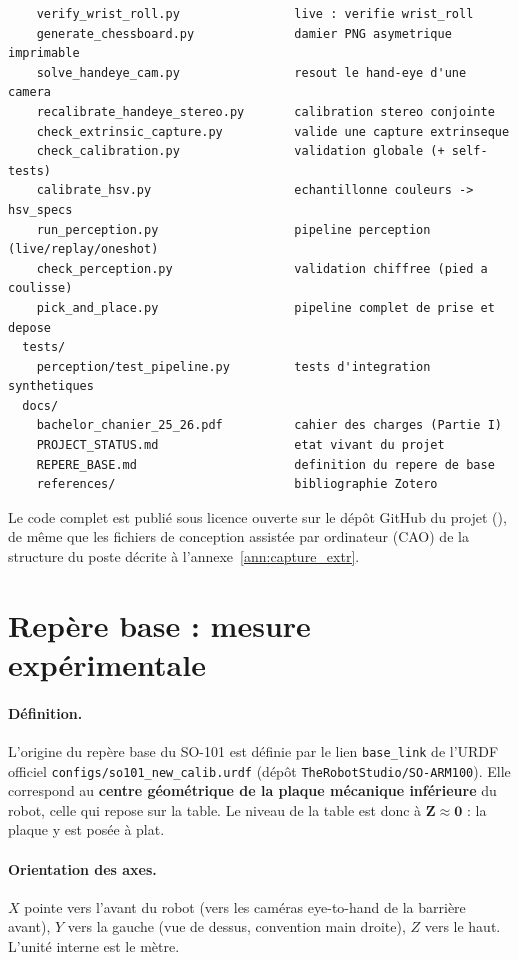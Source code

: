 \begin{verbatim}
    verify_wrist_roll.py                live : verifie wrist_roll
    generate_chessboard.py              damier PNG asymetrique imprimable
    solve_handeye_cam.py                resout le hand-eye d'une camera
    recalibrate_handeye_stereo.py       calibration stereo conjointe
    check_extrinsic_capture.py          valide une capture extrinseque
    check_calibration.py                validation globale (+ self-tests)
    calibrate_hsv.py                    echantillonne couleurs -> hsv_specs
    run_perception.py                   pipeline perception (live/replay/oneshot)
    check_perception.py                 validation chiffree (pied a coulisse)
    pick_and_place.py                   pipeline complet de prise et depose
  tests/
    perception/test_pipeline.py         tests d'integration synthetiques
  docs/
    bachelor_chanier_25_26.pdf          cahier des charges (Partie I)
    PROJECT_STATUS.md                   etat vivant du projet
    REPERE_BASE.md                      definition du repere de base
    references/                         bibliographie Zotero
\end{verbatim}

Le code complet est publié sous licence ouverte sur le dépôt GitHub du projet
(), de même que les
fichiers de conception assistée par ordinateur (CAO) de la structure du poste
décrite à l'annexe~\ref{ann:capture_extr}.

\section{Repère base : mesure expérimentale}
\label{ann:repere_mesure}

\paragraph{Définition.}
L'origine du repère base du SO-101 est définie par le lien
\texttt{base\_link} de l'URDF officiel \texttt{configs/so101\_new\_calib.urdf}
(dépôt \texttt{TheRobotStudio/SO-ARM100}). Elle correspond au
\textbf{centre géométrique de la plaque mécanique inférieure} du robot, celle
qui repose sur la table. Le niveau de la table est donc à
$\mathbf{Z \approx 0}$ : la plaque y est posée à plat.

\paragraph{Orientation des axes.}
$X$ pointe vers l'avant du robot (vers les caméras eye-to-hand de la barrière
avant), $Y$ vers la gauche (vue de dessus, convention main droite), $Z$ vers
le haut. L'unité interne est le mètre.

